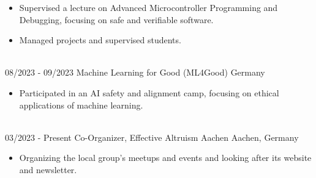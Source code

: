 \begin{twenty}
{\begin{itemize}
            \item Supervised a lecture on Advanced Microcontroller Programming and Debugging, focusing on safe and verifiable software.
            \item Managed projects and supervised students.
        \end{itemize}}
        \\
    \twentyitem
        {08/2023 -}
        {09/2023}
        {Machine Learning for Good (ML4Good)}
        {Germany}
        {}
        {\begin{itemize}
            \item Participated in an AI safety and alignment camp, focusing on ethical applications of machine learning.
        \end{itemize}}
        \\
    \twentyitem
        {03/2023 -}
        {Present}
        {Co-Organizer, Effective Altruism Aachen}
        {Aachen, Germany}
        {}
        {\begin{itemize}
            \item Organizing the local group's meetups and events and looking after its website and newsletter.
        \end{itemize}}
        \\
\end{twenty}
